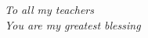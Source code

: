 \null\vfill
\begin{center}
\textsl{To all my teachers \\ You are my greatest blessing}
\end{center}
\vfill
